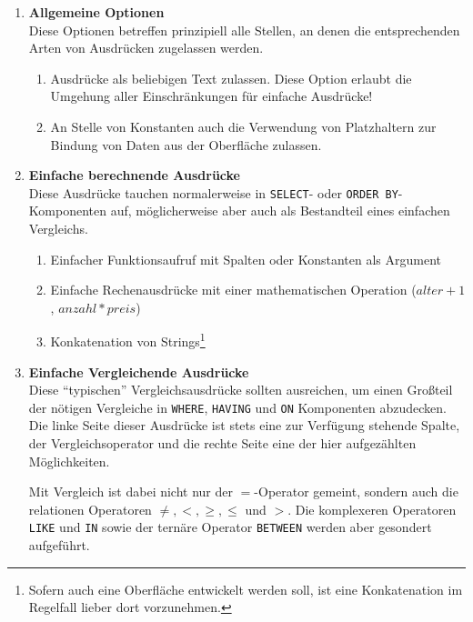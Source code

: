 \begin{enumerate}[resume]
\item \textbf{Allgemeine Optionen} \\
  Diese Optionen betreffen prinzipiell alle Stellen, an denen die entsprechenden Arten von Ausdrücken zugelassen werden.
  \begin{enumerate}[noitemsep]
  \item \label{feat:expr-allow-any-text} Ausdrücke als beliebigen Text zulassen. Diese Option erlaubt die Umgehung aller Einschränkungen für einfache Ausdrücke!
  \item \label{feat:expr-allow-placeholder} An Stelle von Konstanten auch die Verwendung von Platzhaltern zur Bindung von Daten aus der Oberfläche zulassen.
  \end{enumerate}

\item \label{feat:expr-compute}  \textbf{Einfache berechnende Ausdrücke} \\
  Diese Ausdrücke tauchen normalerweise in \texttt{SELECT}- oder \texttt{ORDER BY}-Komponenten auf, möglicherweise aber auch als Bestandteil eines einfachen Vergleichs.
  \begin{enumerate}[noitemsep]
      \item \label{feat:expr-compute-simple-func} Einfacher Funktionsaufruf mit Spalten oder Konstanten als Argument
      \item \label{feat:expr-compute-simple-arithmetic} Einfache Rechenausdrücke mit einer mathematischen Operation ($alter + 1$, $anzahl * preis$)
      \item \label{feat:expr-compute-simple-concat} Konkatenation von Strings\footnote{Sofern auch eine Oberfläche entwickelt werden soll, ist eine Konkatenation im Regelfall lieber dort vorzunehmen.}
  \end{enumerate}

\item \textbf{Einfache Vergleichende Ausdrücke} \\
  Diese "`typischen"' Vergleichsausdrücke sollten ausreichen, um einen Großteil der nötigen Vergleiche in \texttt{WHERE}, \texttt{HAVING} und \texttt{ON} Komponenten abzudecken. Die linke Seite dieser Ausdrücke ist stets eine zur Verfügung stehende Spalte, der Vergleichsoperator und die rechte Seite eine der hier aufgezählten Möglichkeiten.

  Mit Vergleich ist dabei nicht nur der $=$-Operator gemeint, sondern auch die relationen Operatoren $\ne, <,\ge,\le$ und $>$. Die komplexeren Operatoren \texttt{LIKE} und \texttt{IN} sowie der ternäre Operator \texttt{BETWEEN} werden aber gesondert aufgeführt.


\end{enumerate}
